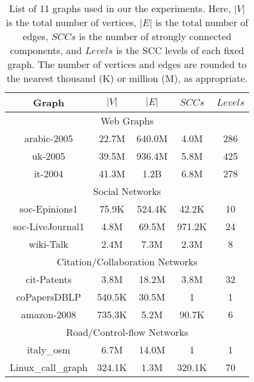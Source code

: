 \begin{table}[!hbtp]
\centering
\begin{tabular}{||c||c|c|c|c||}
 \hline
 \textbf{Graph} &
 \textbf{$|V|$} &
 \textbf{$|E|$} &
 \textbf{$SCCs$} &
 \textbf{$Levels$} \\ \hline
 \multicolumn{5}{|c|}{Web Graphs} \\ \hline
  arabic-2005 & 22.7M & 640.0M & 4.0M & 286 \\ \hline
  uk-2005 & 39.5M & 936.4M & 5.8M & 425 \\ \hline
  it-2004 & 41.3M & 1.2B & 6.8M & 278 \\ \hline
  \multicolumn{5}{|c|}{Social Networks} \\ \hline
  soc-Epinions1 & 75.9K & 524.4K & 42.2K & 10 \\ \hline
  soc-LiveJournal1 & 4.8M & 69.5M & 971.2K & 24 \\ \hline
  wiki-Talk & 2.4M & 7.3M & 2.3M & 8 \\ \hline
  \multicolumn{5}{|c|}{Citation/Collaboration Networks} \\ \hline
  cit-Patents & 3.8M & 18.2M & 3.8M & 32 \\ \hline
  coPapersDBLP & 540.5K & 30.5M & 1 & 1 \\ \hline
  amazon-2008 & 735.3K & 5.2M & 90.7K & 6 \\ \hline
  \multicolumn{5}{|c|}{Road/Control-flow Networks} \\ \hline
  italy\_osm & 6.7M & 14.0M & 1 & 1 \\ \hline
  Linux\_call\_graph & 324.1K & 1.3M & 320.1K & 70 \\ \hline
\end{tabular}
\vspace{0.3 cm}
\caption{List of 11 graphs used in our the experiments. Here, $|V|$ is the total number of vertices, $|E|$ is the total number of edges, $SCCs$ is the number of strongly connected components, and $Levels$ is the SCC levels of each fixed graph. The number of vertices and edges are rounded to the nearest thousand (K) or million (M), as appropriate.}
\label{tab:dataset}
\end{table}
